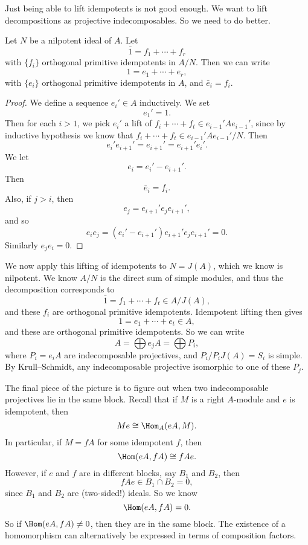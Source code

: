 \documentclass[a4paper]{article}
\begin{document}
Just being able to lift idempotents is not good enough. We want to lift decompositions as projective indecomposables. So we need to do better.
\begin{cor}
  Let $N$ be a nilpotent ideal of $A$. Let
  \[
    \bar{1} = f_1 + \cdots + f_r
  \]
  with $\{f_i\}$ orthogonal primitive idempotents in $A/N$. Then we can write
  \[
    1 = e_1 + \cdots + e_r,
  \]
  with $\{e_i\}$ orthogonal primitive idempotents in $A$, and $\bar{e}_i = f_i$.
\end{cor}

\begin{proof}
  We define a sequence $e_i' \in A$ inductively. We set
  \[
    e_1' = 1.
  \]
  Then for each $i > 1$, we pick $e_i'$ a lift of $f_i + \cdots + f_t \in e_{i - 1}' A e_{i - 1}'$, since by inductive hypothesis we know that $f_i + \cdots + f_t \in e_{i - 1}' A e_{i - 1}'/N$. Then
  \[
    e_i' e_{i + 1}' = e_{i + 1}' = e_{i + 1}' e_i'.
  \]
  We let
  \[
    e_i = e_i'- e_{i + 1}'.
  \]
  Then
  \[
    \bar{e}_i = f_i.
  \]
  Also, if $j > i$, then
  \[
    e_j = e_{i + 1}' e_j e_{i + 1}',
  \]
  and so
  \[
    e_i e_j = (e_i' - e_{i + 1}') e_{i + 1}' e_j e_{i + 1}' = 0.
  \]
  Similarly $e_j e_i = 0$.
\end{proof}

We now apply this lifting of idempotents to $N = J(A)$, which we know is nilpotent. We know $A/N$ is the direct sum of simple modules, and thus the decomposition corresponds to
\[
  \bar{1} = f_1 + \cdots + f_t \in A/J(A),
\]
and these $f_i$ are orthogonal primitive idempotents. Idempotent lifting then gives
\[
  1 = e_1 + \cdots + e_t \in A,
\]
and these are orthogonal primitive idempotents. So we can write
\[
  A = \bigoplus e_j A = \bigoplus P_i,
\]
where $P_i = e_i A$ are indecomposable projectives, and $P_i/P_i J(A) = S_i$ is simple. By Krull--Schmidt, any indecomposable projective isomorphic to one of these $P_j$.

The final piece of the picture is to figure out when two indecomposable projectives lie in the same block. Recall that if $M$ is a right $A$-module and $e$ is idempotent, then
\[
  Me \cong \Hom_A(eA, M).
\]
In particular, if $M = fA$ for some idempotent $f$, then
\[
  \Hom(eA, fA) \cong fAe.
\]
However, if $e$ and $f$ are in different blocks, say $B_1$ and $B_2$, then
\[
  fAe \in B_1 \cap B_2 = 0,
\]
since $B_1$ and $B_2$ are (two-sided!) ideals. So we know
\[
  \Hom(eA, fA) = 0.
\]
So if $\Hom(eA, fA) \not= 0$, then they are in the same block. The existence of a homomorphism can alternatively be expressed in terms of composition factors.
\end{document}
